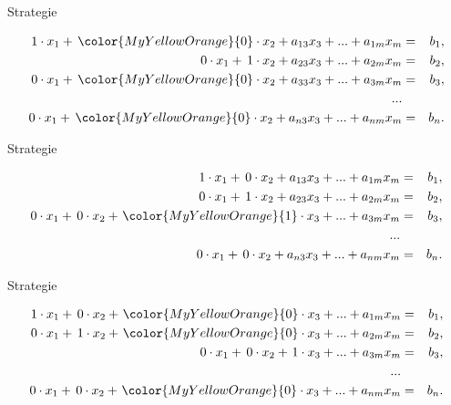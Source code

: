 \documentclass[german]{beamer}
\newcommand{\bq}{\begin{eqnarray*}}
\newcommand{\eq}{\end{eqnarray*}}
\newcommand{\superalert}[1]{{\color{MyYellowOrange}{#1}}}
\begin{document}
\begin{frame}{Strategie}

\bq
 1 \cdot x_1 + \, \superalert{0} \cdot x_2 + a_{13} x_3 + ... + a_{1m} x_m & = & b_1,
\nonumber \\
 0 \cdot x_1 + \, 1 \cdot x_2 + a_{23} x_3 + ... + a_{2m} x_m & = & b_2,
\nonumber \\
 0 \cdot x_1 + \, \superalert{0} \cdot x_2 + a_{33} x_3 + ... + a_{3m} x_m & = & b_3,
\nonumber \\
 ... & & 
\nonumber \\
 0 \cdot x_1 + \, \superalert{0} \cdot x_2 + a_{n3} x_3 + ... + a_{nm} x_m & = & b_n.
\eq

\end{frame}

\begin{frame}{Strategie}

\bq
 1 \cdot x_1 + \, 0 \cdot x_2 + a_{13} x_3 + ... + a_{1m} x_m & = & b_1,
\nonumber \\
 0 \cdot x_1 + \, 1 \cdot x_2 + a_{23} x_3 + ... + a_{2m} x_m & = & b_2,
\nonumber \\
 0 \cdot x_1 + \, 0 \cdot x_2 + \;\! \superalert{1} \cdot x_3 + ... + a_{3m} x_m & = & b_3,
\nonumber \\
 ... & & 
\nonumber \\
 0 \cdot x_1 + \, 0 \cdot x_2 + a_{n3} x_3 + ... + a_{nm} x_m & = & b_n.
\eq

\end{frame}

\begin{frame}{Strategie}

\bq
 1 \cdot x_1 + \, 0 \cdot x_2 + \;\! \superalert{0} \cdot x_3 + ... + a_{1m} x_m & = & b_1,
\nonumber \\
 0 \cdot x_1 + \, 1 \cdot x_2 + \;\! \superalert{0} \cdot x_3 + ... + a_{2m} x_m & = & b_2,
\nonumber \\
 0 \cdot x_1 + \, 0 \cdot x_2 + \;\! 1 \cdot x_3 + ... + a_{3m} x_m & = & b_3,
\nonumber \\
 ... & & 
\nonumber \\
 0 \cdot x_1 + \, 0 \cdot x_2 + \;\! \superalert{0} \cdot x_3 + ... + a_{nm} x_m & = & b_n.
\eq

\end{frame}
\end{document}
